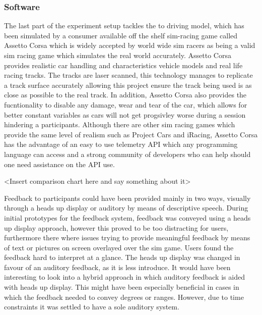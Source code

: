 \subsubsection{Software}
The last part of the experiment setup tackles the to driving model, which has been simulated by a consumer available off the shelf sim-racing game called Assetto Corsa which is widely accepted by world wide sim racers as being a valid sim racing game which simulates the real world accurately. Assetto Corsa provides realistic car handling and characteristics vehicle models and real life racing tracks. The tracks are laser scanned, this technology manages to replicate a track surface accurately allowing this project ensure the track being used is as close as possible to the real track. In addition, Assetto Corsa also provides the fucntionality to disable any damage, wear and tear of the car, which allows for better constant variables as cars will not get progsivley worse during a session hindering a participants. Although there are other sim racing games which provide the same level of realism such as Project Cars and iRacing, Assetto Corsa has the advantage of an easy to use telemetry API which any programming language can access and a strong community of developers who can help should one need assistance on the API use.

<Insert comparison chart here and say something about it>

Feedback to participants could have been provided mainly in two ways, visually through a heads up display or auditory by means of descriptive speech. During initial prototypes for the feedback system, feedback was conveyed using a heads up display approach, however this proved to be too distracting for users, furthermore there where issues trying to provide meaningful feedback by means
of text or pictures on screen overlayed over the sim game. Users found the feedback hard to interpret at a glance. The heads up display was changed in favour of an auditory feedback, as it is less introduce\cite{leahy2003auditory}. It would have been interesting to look into a hybrid approach in which auditory feedback is aided with heads up display. This might have been especially beneficial in cases in which the feedback needed to convey degrees or ranges. However, due to time constraints it was settled to have a sole auditory system.

